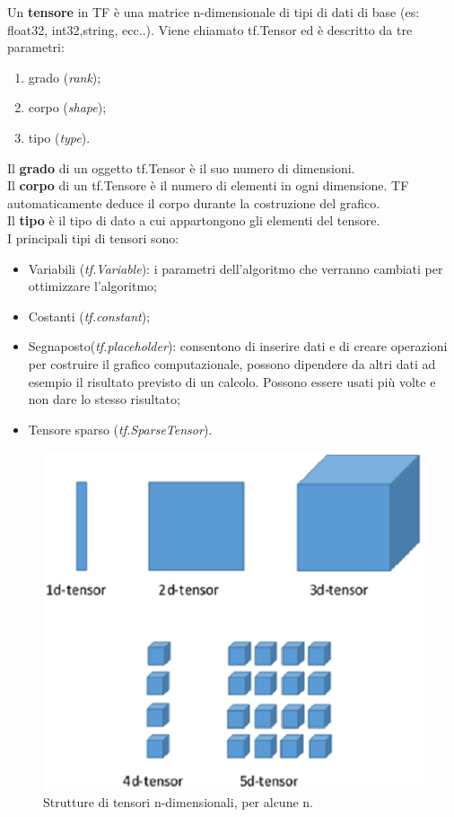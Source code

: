 \documentclass[a4paper,12pt]{report}
\begin{document}
\begin{defin}
Un \textbf{tensore} in TF \`{e} una matrice n-dimensionale di tipi di dati di base (es: float32, int32,string, ecc..). Viene chiamato tf.Tensor ed \`{e} descritto da tre parametri:
\begin{enumerate}
\item grado  (\textit{rank});
\item corpo (\textit{shape});
\item tipo (\textit{type}).
\end{enumerate}
\end{defin}
Il \textbf{grado} di un oggetto tf.Tensor \`{e} il suo numero di dimensioni.\\
Il \textbf{corpo} di un tf.Tensore \`{e} il numero di elementi in ogni dimensione. TF automaticamente deduce il corpo durante la costruzione del grafico.\\
Il \textbf{tipo} \`{e} il tipo di dato a cui appartongono gli elementi del tensore.\\
I principali tipi di tensori sono:
\begin{itemize}
\item Variabili (\textit{tf.Variable}): i parametri dell'algoritmo che verranno cambiati per ottimizzare l'algoritmo;
\item Costanti (\textit{tf.constant});
\item Segnaposto(\textit{tf.placeholder}): consentono di inserire dati e di creare operazioni per costruire il grafico computazionale, possono dipendere da altri dati ad esempio il risultato previsto di un calcolo. Possono essere usati pi\`{u} volte e non dare lo stesso risultato;
\item Tensore sparso (\textit{tf.SparseTensor}).
\end{itemize}
\begin{figure}[!h]
\centering
\includegraphics[scale=0.7]{tensori}
\caption{Strutture di tensori n-dimensionali, per alcune n.}
\end{figure}
\newpage
\end{document}
